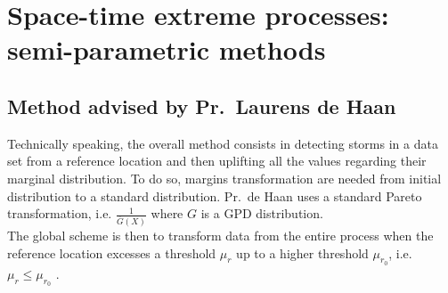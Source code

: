 \section{Space-time extreme processes: semi-parametric methods}
\subsection{Method advised by Pr.~Laurens de Haan}

Technically speaking, the overall method consists in detecting storms in a data set from a reference location and then uplifting all the values regarding their marginal distribution. To do so, margins transformation are needed from initial distribution to a standard distribution.
Pr.~de Haan uses a standard Pareto transformation, i.e. $\frac{1}{\overline{G}(X)}$ where $G$ is a GPD distribution.\\
The global scheme is then to transform data from the entire process when the reference location excesses a threshold $\mu_{r}$ up to a higher threshold $\mu_{r_0}$, i.e. $\mu_{r} \leq \mu_{r_0}$ .\\


